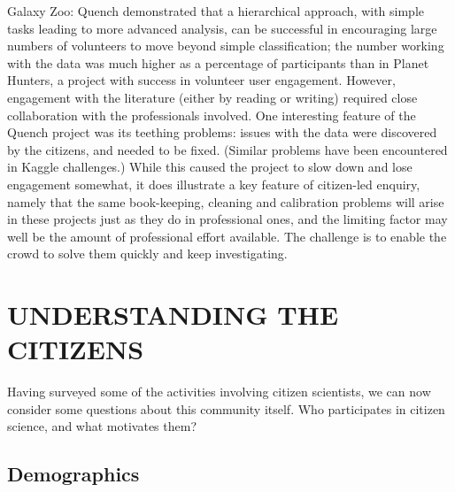 \documentclass{ar2e}
\begin{document}
Galaxy Zoo: Quench demonstrated that a hierarchical approach, with simple
tasks leading to more advanced analysis, can be successful in encouraging
large numbers of volunteers to move beyond simple classification; the number
working with the data was much higher as a percentage of participants than in
Planet Hunters, a project with success in volunteer user engagement.  However,
engagement with the literature (either by reading or writing) required close
collaboration with the professionals involved. One interesting feature of the
Quench project was its teething problems: issues with the data were discovered
by the citizens, and needed to be fixed. (Similar problems have been
encountered in Kaggle challenges.) While this caused the project to slow down
and lose engagement somewhat, it does illustrate a key feature of citizen-led
enquiry, namely that the same book-keeping, cleaning and calibration problems
will arise in these projects just as they do in professional ones, and the
limiting factor may well be the  amount of professional effort available. The
challenge is to enable the crowd to solve them quickly and keep investigating.



\section{UNDERSTANDING THE CITIZENS}
\label{sec:crowd}

Having surveyed some of the activities involving citizen scientists, we can
now consider some questions about this community itself. Who participates in
citizen science, and what motivates them?



\subsection{Demographics}
\label{sec:crowd:demographics}
\end{document}
